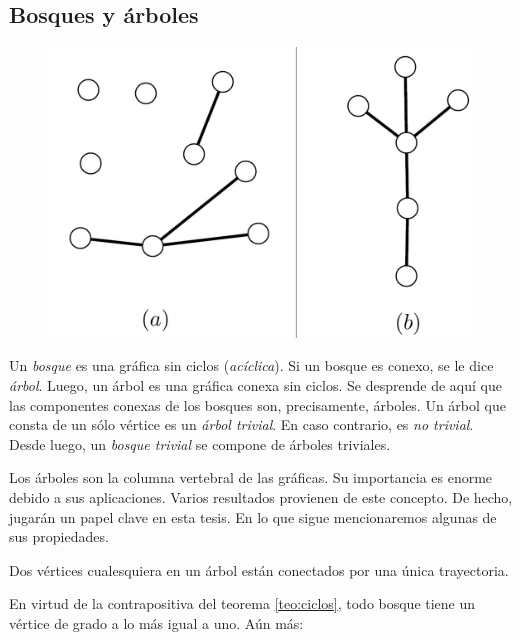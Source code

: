         \subsection{Bosques y árboles} \label{sec:arboles}
\begin{figure}
\vspace{-1cm}
 \centering
  \includegraphics[scale=0.25]{img/imgchapter1/arboles.jpg}
  \caption{}
  \label{fig:arboles}
\end{figure}
Un \textit{bosque} es una gráfica sin ciclos (\textit{acíclica}). Si un bosque es conexo, se le dice \textit{árbol}.  Luego, un árbol es una gráfica conexa sin ciclos. Se desprende de aquí que las componentes conexas de los bosques son, precisamente, árboles. Un  árbol que consta de un sólo vértice es un \textit{árbol trivial}. En caso contrario, es \textit{no trivial}. Desde luego, un \textit{bosque trivial} se compone de árboles triviales. 

Los árboles son la columna vertebral de las gráficas. Su importancia es enorme  debido a sus aplicaciones. Varios resultados provienen de este concepto. De hecho, jugarán un papel clave en esta tesis. En lo que sigue mencionaremos algunas de sus propiedades.

\begin{prop}\label{prop:treepath}
Dos vértices cualesquiera en un árbol están conectados por una única trayectoria.
\end{prop}

En virtud de la contrapositiva del teorema \ref{teo:ciclos}, todo bosque tiene un vértice de grado a lo más igual a uno. Aún más:

